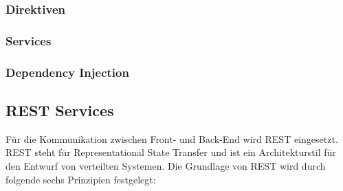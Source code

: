 \subsubsection{Direktiven}
\subsubsection{Services}
\subsubsection{Dependency Injection}

\subsection{REST Services}
Für die Kommunikation zwischen Front- und Back-End wird REST eingesetzt. REST steht für Representational State Transfer und ist ein Architekturstil für den Entwurf von verteilten Systemen. Die Grundlage von REST wird durch folgende sechs Prinzipien festgelegt\cite{Varanasi2015}:

